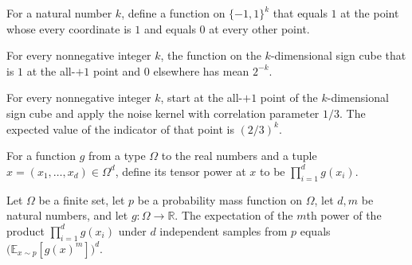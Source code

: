 \begin{definition}
\label{FABL.pointSubcubeIndicator}
\leanok
{}
For a natural number $k$, define a function on $\{−1,1\}^k$ that equals $1$ at the point
whose every coordinate is $1$ and equals $0$ at every other point.
\end{definition}

\begin{theorem}
\label{FABL.mean_pointSubcubeIndicator}
\leanok
{}
For every nonnegative integer $k$, the function on the $k$-dimensional sign cube that is
$1$ at the all-$+1$ point and $0$ elsewhere has mean $2^{-k}$.
\end{theorem}

\begin{theorem}
\label{FABL.pointSubcube_oneThird_stayProbability}
\leanok
{}
For every nonnegative integer $k$, start at the all-$+1$ point of the $k$-dimensional
sign cube and apply the noise kernel with correlation parameter $1/3$. The expected
value of the indicator of that point is $(2/3)^k$.
\end{theorem}

\begin{definition}
\label{FABL.pmfTensorPower}
\leanok
For a function $g$ from a type $\Omega$ to the real numbers and a tuple
$x=(x_1,\ldots,x_d)\in\Omega^d$, define its tensor power at $x$ to be $\prod_{i=1}^d
g(x_i)$.
\end{definition}

\begin{theorem}
\label{FABL.exercise9_6_tensorPower_moment}
\leanok
{}
Let $\Omega$ be a finite set, let $p$ be a probability mass function on $\Omega$, let
$d,m$ be natural numbers, and let $g:\Omega\to\mathbb R$. The expectation of the $m$th
power of the product $\prod_{i=1}^d g(x_i)$ under $d$ independent samples from $p$
equals $\bigl(\mathbb E_{x\sim p}[g(x)^m]\bigr)^d$.
\end{theorem}

